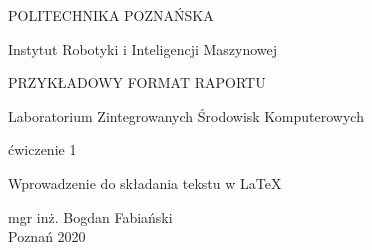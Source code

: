 \begin{titlepage}
	\begin{center}
	\fontsize{28pt}{28pt}\selectfont
	
POLITECHNIKA POZNAŃSKA
	
  \vspace*{12mm}
	
		\fontsize{24pt}{24pt}\selectfont

Instytut Robotyki i Inteligencji Maszynowej
	
	 \vspace*{5mm}
	
\begin{figure}[!htb]
\centering
  \label{fig:PPLogo}
\end{figure} 
	

	\vspace*{5mm}

	
	\fontsize{24pt}{24pt}\selectfont
	PRZYKŁADOWY FORMAT RAPORTU \\
	
		\fontsize{18pt}{18pt}\selectfont
	\vspace*{5mm}
  
 Laboratorium Zintegrowanych Środowisk Komputerowych
		\fontsize{14pt}{14pt}\selectfont
	\vspace*{10mm}

  ćwiczenie 1

	\vspace*{5mm}
	\fontsize{22pt}{22pt}\selectfont
Wprowadzenie do składania tekstu w \LaTeX
	\vspace*{10mm}
	\fontsize{16pt}{16pt}\selectfont

mgr inż. Bogdan Fabiański\\

 \fontsize{16pt}{16pt}\selectfont
	\vspace*{18mm}
	Poznań 2020
	\end{center}
\end{titlepage}

